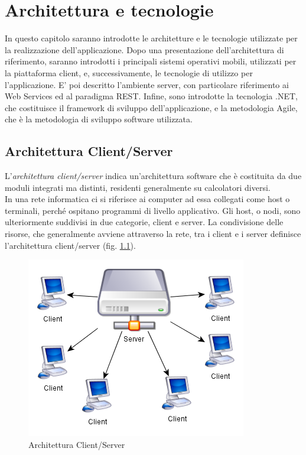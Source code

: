 
\chapter{Architettura e tecnologie}
\label{ref:architettura}

In questo capitolo saranno introdotte le architetture e le tecnologie utilizzate per la realizzazione dell'applicazione.
Dopo una presentazione dell'architettura di riferimento, saranno introdotti i principali sistemi operativi mobili, utilizzati per la piattaforma client, e, successivamente, le tecnologie di utilizzo per l'applicazione.
E' poi descritto l'ambiente server, con particolare riferimento ai Web Services ed al paradigma REST.
Infine, sono introdotte la tecnologia .NET, che costituisce il framework di sviluppo dell'applicazione, e la metodologia Agile, che è la metodologia di sviluppo software utilizzata.

\section{Architettura Client/Server}
L'\emph{architettura client/server} indica un'architettura software che è costituita da due moduli integrati ma distinti, residenti generalmente su calcolatori diversi.\\
In una rete informatica ci si riferisce ai computer ad essa collegati come host o terminali, perché ospitano programmi di livello applicativo. 
Gli host, o nodi, sono ulteriormente suddivisi in due categorie, client e server. La condivisione delle risorse, che generalmente avviene attraverso la rete, tra i client e i server definisce l'architettura client/server (fig. \ref{clientserver}).

\begin{figure}[h]
\begin{center}
\includegraphics[scale=0.75]{imgs/clientserver.png} 
\caption{Architettura Client/Server\label{clientserver}}
\end{center}
\end{figure}

